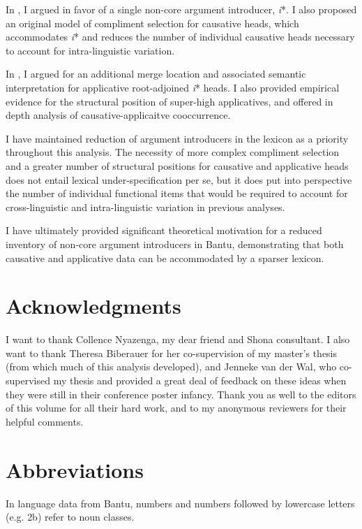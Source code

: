 \documentclass[output=paper,modfonts,nonflat]{langsci/langscibook}
\begin{document}
In , I argued in favor of a single non-core argument introducer, \textit{i}*. I also proposed an original model of compliment selection for causative heads, which accommodates \textit{i}* and reduces the number of individual causative heads necessary to account for intra-linguistic variation. 

In , I argued for an additional merge location and associated semantic interpretation for applicative root-adjoined \textit{i}* heads. I also provided empirical evidence for the structural position of super-high applicatives, and offered in depth analysis of causative-applicaitve cooccurrence. 

I have maintained reduction of argument introducers in the lexicon as a priority throughout this analysis. The necessity of more complex compliment selection and a greater number of structural positions for causative and applicative heads does not entail lexical under-specification per se, but it does put into perspective the number of individual functional items that would be required to account for cross-linguistic and intra-linguistic variation in previous analyses. 


I have ultimately provided significant theoretical motivation for a reduced inventory of non-core argument introducers in Bantu, demonstrating that both causative and applicative data can be accommodated by a sparser lexicon. 


\section*{Acknowledgments}\label{sec:wechsler:ack}

I want to thank Collence Nyazenga, my dear friend and Shona consultant. I also want to thank Theresa Biberauer for her co-supervision of my master’s thesis (from which much of this analysis developed), and Jenneke van der Wal, who co-supervised my thesis and provided a great deal of feedback on these ideas when they were still in their conference poster infancy. Thank you as well to the editors of this volume for all their hard work, and to my anonymous reviewers for their helpful comments.  

\section*{Abbreviations}\label{sec:wechsler:abb}

{{In} {language} {data} {from} {Bantu,} {numbers} {and} {numbers} {followed} {by} {lowercase} {letters} {(e.g.} {2b)} {refer} {to} {noun} {classes.}}
\end{document}
